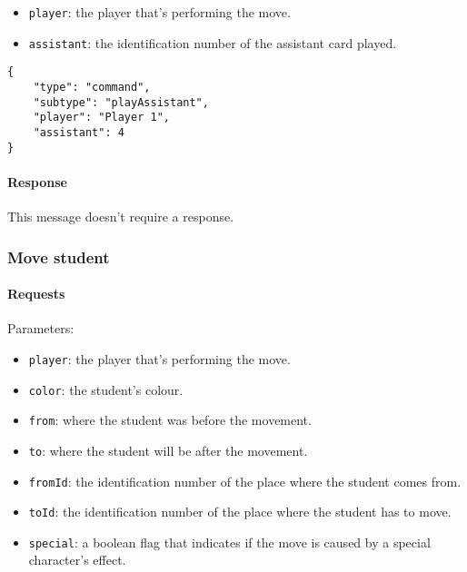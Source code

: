 \documentclass[a4paper]{article}
\begin{document}
	\begin{itemize}
		\item \verb|player|: the player that's performing the move.
		\item \verb|assistant|: the identification number of the assistant card played.
	\end{itemize}

	\begin{verbatim}
{
	"type": "command",
	"subtype": "playAssistant",
	"player": "Player 1",
	"assistant": 4
}
	\end{verbatim}

	\paragraph{Response} This message doesn't require a response.

	\subsubsection{Move student}

	\paragraph{Requests} Parameters:

	\begin{itemize}
		\item \verb|player|: the player that's performing the move.
		\item \verb|color|: the student's colour.
		\item \verb|from|: where the student was before the movement.
		\item \verb|to|: where the student will be after the movement.
		\item \verb|fromId|: the identification number of the place where the student comes from.
		\item \verb|toId|: the identification number of the place where the student has to move.
		\item \verb|special|: a boolean flag that indicates if the move is caused by a special character's effect.
	\end{itemize}
\end{document}
